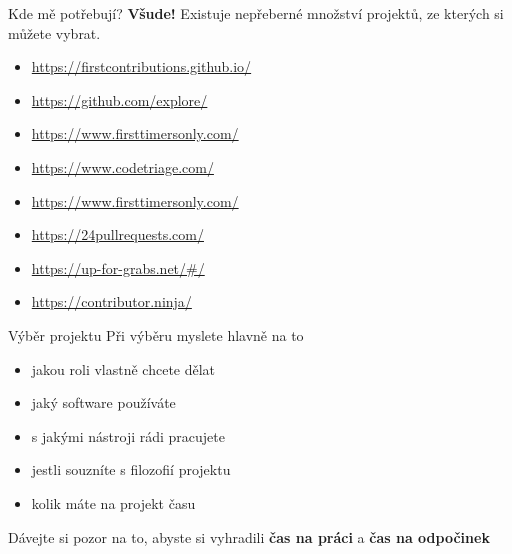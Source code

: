 \documentclass[11pt]{beamer}
\begin{document}
 \begin{frame}{Kde mě potřebují?}
 	\textbf{Všude!} Existuje nepřeberné množství projektů, ze kterých si můžete vybrat.
 	
	\begin{itemize}
		\item \url{https://firstcontributions.github.io/}
		\item \url{https://github.com/explore/}
		\item \url{https://www.firsttimersonly.com/}
		\item \url{https://www.codetriage.com/}
		\item \url{https://www.firsttimersonly.com/}
		\item \url{https://24pullrequests.com/}
		\item \url{https://up-for-grabs.net/\#/}
		\item \url{https://contributor.ninja/}
	\end{itemize}
\end{frame}

\begin{frame}{Výběr projektu}
	Při výběru myslete hlavně na to
	\begin{itemize}
		\item jakou roli vlastně chcete dělat
		\item jaký software používáte
		\item s jakými nástroji rádi pracujete
		\item jestli souzníte s filozofií projektu
		\item kolik máte na projekt času
	\end{itemize}
	Dávejte si pozor na to, abyste si vyhradili \textbf{čas na práci} a \textbf{čas na odpočinek}
\end{frame}
\end{document}
